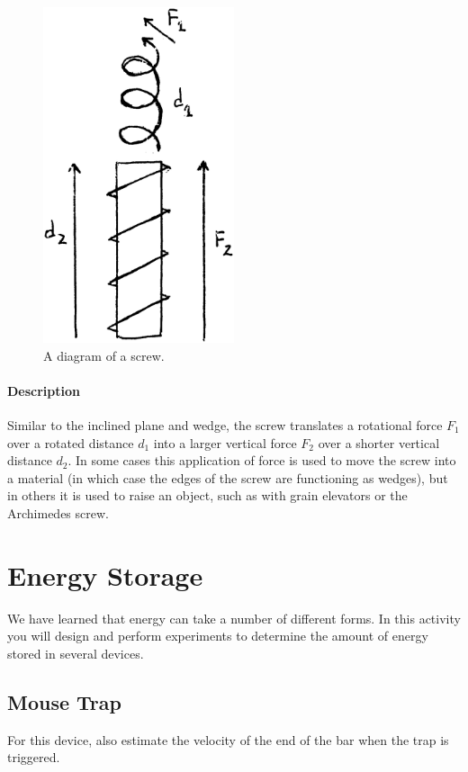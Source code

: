 \documentclass[12pt]{article}
\begin{document}
	\begin{figure}[H]
		\centerline{\includegraphics[width=0.5\textwidth]{images/screw.EPS}}
		\caption{A diagram of a screw.}
	\end{figure}
	
	\paragraph{Description}
	Similar to the inclined plane and wedge, the screw translates a rotational force $F_1$ over a rotated distance $d_1$ into a larger vertical force $F_2$ over a shorter vertical distance $d_2$. In some cases this application of force is used to move the screw into a material (in which case the edges of the screw are functioning as wedges), but in others it is used to raise an object, such as with grain elevators or the Archimedes screw.

	
	\section{Energy Storage}
	We have learned that energy can take a number of different forms. In this activity you will design and perform experiments to determine the amount of energy stored in several devices.

	\subsection{Mouse Trap}
	For this device, also estimate the velocity of the end of the bar when the trap is triggered.
\end{document}
